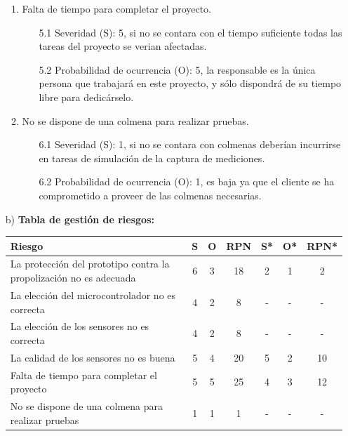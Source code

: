 \documentclass[
11pt, %
codirector, %
]{charter}
\begin{document}
\begin{itemize}[font=\bfseries]
\begin{enumerate}
		\item Falta de tiempo para completar el proyecto.
\begin{itemize}
	\item[5.1] Severidad (S): 5, si no se contara con el tiempo suficiente todas las tareas del proyecto se verian afectadas.
	\item[5.2] Probabilidad de ocurrencia (O): 5, la responsable es la única persona que trabajará en este proyecto, y sólo dispondrá de su tiempo libre para dedicárselo.
\end{itemize} 		
		\item No se dispone de una colmena para realizar pruebas.
\begin{itemize}
	\item[6.1] Severidad (S): 1, si no se contara con colmenas deberían incurrirse en tareas de simulación de la captura de mediciones.
	\item[6.2] Probabilidad de ocurrencia (O): 1, es baja ya que el cliente se ha comprometido a proveer de las colmenas necesarias.
\end{itemize} 			
	\end{enumerate}
	\item[b)] {\bf Tabla de gestión de riesgos:}

	\begin{table}[htpb]
	\centering
	\begin{tabularx}{\linewidth}{@{}|X|c|c|c|c|c|c|@{}}
	\hline
	\rowcolor[HTML]{C0C0C0} 
	Riesgo & S & O & RPN & S* & O* & RPN* \\ \hline
	La protección del prototipo contra la propolización no es adecuada       &  6 &  3 &  \cellcolor{red!25}18   &  2  &  1  &   \cellcolor{green!25}2   \\ \hline
	La elección del microcontrolador no es correcta       & 4  & 2  &  \cellcolor{green!25}8   &   - &  -  &    -  \\ \hline
	La elección de los sensores no es correcta       & 4  & 2  &  \cellcolor{green!25}8   &  -  &  -  &    -  \\ \hline
	La calidad de los sensores no es buena       & 5  & 4  &  \cellcolor{red!25}20   &  5  &  2  &   \cellcolor{green!25}10   \\ \hline
    Falta de tiempo para completar el proyecto &  5 & 5  &  \cellcolor{red!25}25   &  4  &  3  &    \cellcolor{green!25}12     \\ \hline
    No se dispone de una colmena para realizar pruebas & 1 & 1 & \cellcolor{green!25}1 & - & - & - \\ \hline
	\end{tabularx}%
	\end{table}
	

\end{itemize}
\end{document}
